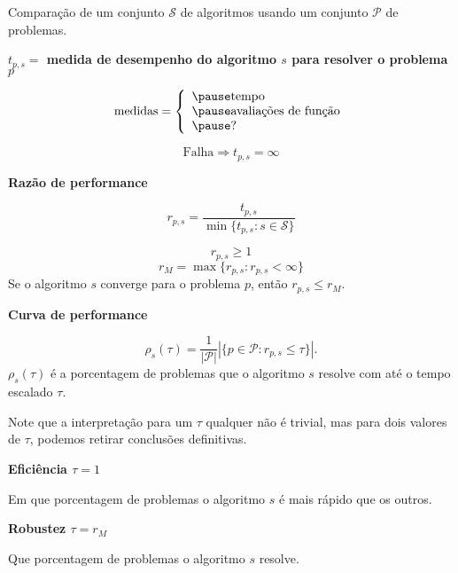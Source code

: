 \documentclass[10pt]{beamer}
\title{\mytitle}
\author{\myauthor}
\date{ }
\newcommand{\myframe}[1]{
\begin{frame}

{#1}

\end{frame}}
\newcommand{\ctr}[1]{\begin{center}{\bf #1}\vspace{0.5 cm}\end{center}}
\begin{document}
\myframe{
  \maketitle
}

\myframe{
  Comparação de um conjunto $\mathcal{S}$ de algoritmos usando um conjunto
  $\mathcal{P}$ de problemas.
  \pause

  \ctr{ $t_{p,s} = $ medida de desempenho do algoritmo $s$ para resolver o
    problema $p$}
    \pause
  
  $$ \mbox{medidas} = \left\{ 
    \begin{array}{l} \pause
      \mbox{tempo} \\ \pause
      \mbox{avaliações de função} \\ \pause
      \mbox{?}
    \end{array} \right.$$
  \pause

  $$ \mbox{Falha} \Longrightarrow t_{p,s} = \infty $$
}

\myframe{
  \ctr{ Razão de performance }
  $$r_{p,s} = \dfrac{t_{p,s}}{\min\{t_{p,s}:s\in\mathcal{S}\}}$$
  \pause

  $$ r_{p,s} \geq 1 $$
  \pause
  $$ r_M = \max\{ r_{p,s} : r_{p,s} < \infty \} $$
  \pause
  Se o algoritmo $s$ converge para o problema $p$, então
  $r_{p,s} \leq r_M$.
}

\myframe{
  \ctr{ Curva de performance }
  $$ \rho_s(\tau) = \frac{1}{ |\mathcal{P}| }
  |\{p \in \mathcal{P} : r_{p,s} \leq \tau \}|. $$
  \pause
  $\rho_s(\tau)$ é a porcentagem de problemas que o algoritmo $s$ resolve com
  até o tempo escalado $\tau$.
}

\myframe{
  Note que a interpretação para um $\tau$ qualquer não é trivial, mas para dois
  valores de $\tau$, podemos retirar conclusões definitivas.
  \pause

  \vspace{1.0cm}
  \begin{center}
  \begin{minipage}{0.43\textwidth}
    \ctr{Eficiência $\tau = 1$}
    Em que porcentagem de problemas o algoritmo $s$ é mais rápido que os outros.
  \end{minipage}
  \hspace{0.1\textwidth}
  \begin{minipage}{0.43\textwidth}
    \ctr{Robustez $\tau = r_M$}
    Que porcentagem de problemas o algoritmo $s$ resolve.
  \end{minipage}
  \end{center}
}
\end{document}
